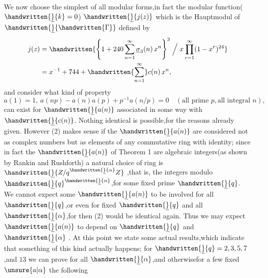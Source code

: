 We now choose the simplest of all modular forms,in fact the modular function($\handwritten{\underline}{k}=0$) $\handwritten{\underline}{j(z)}$ which is the Hauptmodul of $\handwritten{\underline}{\handwritten{\Gamma}}$ defined by
\[
\begin{aligned}
j(z)&=\handwritten{\left\{1+240\sum_{n=1}^{\infty}\underline{\sigma}_{3}(n)\,x^n\right\}^{3}\Bigm/ x\prod_{r=1}^{\infty}(1-x^{r})^{24}}\\
&=x^{-1}+744+\handwritten{\sum_{n=1}^{\infty}}c(n)\,x^n,
\end{aligned}
\]
\reversemarginpar{}\normalmarginpar
and consider what kind of property
\[
a(1)=1,\ a(np)-a(n)a(p)+p^{-1}a(n/p)=0\quad (\text{all prime }p,\text{all integral }n),
\tag*{(2)}
\]
can exist for $\handwritten{\underline}{a(n)}$ associated in some way with $\handwritten{\underline}{c(n)}$. Nothing identical is possible,for the reasons already given. However (2) makes sense if the $\handwritten{\underline}{a(n)}$ are considered not as complex numbers but as elements of any commutative ring with identity; since in fact the $\handwritten{\underline}{a(n)}$ of Theorem 1 are algebraic integers(as shown by Rankin and Rushforth) a natural choice of ring is $\handwritten{\underline}{Z/q^{\handwritten{\underline}{\alpha}}Z}$ ,that is, the integers modulo $\handwritten{\underline}{q}^{\handwritten{\underline}{\alpha}}$,for some fixed prime $\handwritten{\underline}{q}$. We cannot expect some  $\handwritten{\underline}{a(n)}$ to be involved for all $\handwritten{\underline}{q}$,or even for fixed $\handwritten{\underline}{q}$ and all $\handwritten{\underline}{\alpha}$,for then (2) would be identical again. Thus we may expect $\handwritten{\underline}{a(n)}$ to depend on $\handwritten{\underline}{q}$ and $\handwritten{\underline}{\alpha}$ . At this point we  state some actual results,which indicate that something of this kind actually happens; for $\handwritten{\underline}{q}=2,3,5,7$,and $13$ we can prove for all $\handwritten{\underline}{\alpha}$,and otherwisefor a few fixed $\unsure{a|\alpha}$ the following


